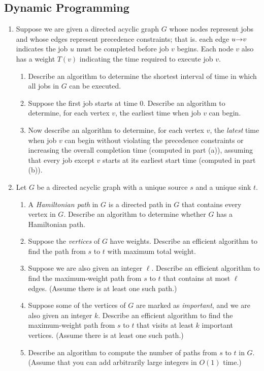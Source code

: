 \begin{exercises}
\subsection*{Dynamic Programming}

\begin{enumerate}[label=\arabic*.,ref=\thechapter.\arabic*,leftmargin=*,align=left,itemsep=1.5ex plus 0.5ex,start=12]
\item Suppose we are given a directed acyclic graph $G$ whose nodes represent jobs and whose edges represent precedence constraints; that is. each edge $u\mathord{\rightarrow}v$ indicates the job $u$ must be completed before job $v$ begins.
Each node $v$ also has a weight $T(v)$ indicating the time required to execute job $v$.
\begin{enumerate}
\item Describe an algorithm to determine the shortest interval of time in which all jobs in $G$ can be executed.
\item Suppose the first job starts at time $0$.
Describe an algorithm to determine, for each vertex $v$, the earliest time when job $v$ can begin.
\item Now describe an algorithm to determine, for each vertex $v$, the \textit{latest} time when job $v$ can begin without violating the precedence constraints or increasing the overall completion time (computed in part (a)), assuming that every job except $v$ starts at its earliest start time (computed in part (b)).
\end{enumerate}

\item Let $G$ be a directed acyclic graph with a unique source $s$ and a unique sink $t$.
\begin{enumerate}
\item A \textit{Hamiltonian path} in $G$ is a directed path in $G$ that contains every vertex in $G$.
Describe an algorithm to determine whether $G$ has a Hamiltonian path.
\item Suppose the \textit{vertices} of $G$ have weights.
Describe an efficient algorithm to find the path from $s$ to $t$ with maximum total weight.
\item Suppose we are also given an integer $\ell$.
Describe an efficient algorithm to find the maximum-weight path from $s$ to $t$ that contains at most $\ell$ edges.
(Assume there is at least one such path.)
\item Suppose some of the vertices of $G$ are marked as \textit{important}, and we are also given an integer $k$.
Describe an efficient algorithm to find the maximum-weight path from $s$ to $t$ that visits at least $k$ important vertices.
(Assume there is at least one such path.)
\item Describe an algorithm to compute the number of paths from $s$ to $t$ in $G$.
(Assume that you can add arbitrarily large integers in $O(1)$ time.)
\end{enumerate}


\end{enumerate}
\end{exercises}
